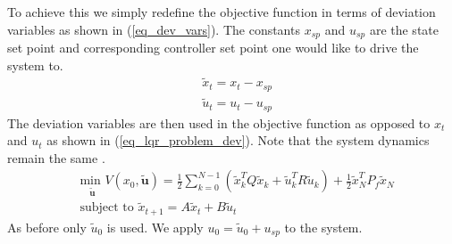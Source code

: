 \documentclass[../masters.tex]{subfiles}
\begin{document}
To achieve this we simply redefine the objective function in terms of deviation variables as shown in (\ref{eq_dev_vars}). The constants $x_{sp}$ and $u_{sp}$ are the state set point and corresponding controller set point one would like to drive the system to.
\begin{equation}
\begin{aligned}
&\tilde{x}_t = x_t-x_{sp} \\
&\tilde{u}_t = u_t-u_{sp}
\end{aligned}
\label{eq_dev_vars}
\end{equation} 
The deviation variables are then used in the objective function as opposed to $x_t$ and $u_t$ as shown in (\ref{eq_lqr_problem_dev}). Note that the system dynamics remain the same \cite{raw}. 
\begin{equation}
\begin{aligned}
&\underset{\tilde{\mathbf{u}}}{\text{min }} V(x_0, \tilde{\mathbf{u}}) = \frac{1}{2}\sum_{k=0}^{N-1} \left( \tilde{x}_k^TQ\tilde{x}_k + \tilde{u}_k^TR\tilde{u}_k \right) + \frac{1}{2}\tilde{x}_N^TP_f\tilde{x}_N \\
& \text{subject to } \tilde{x}_{t+1}=A\tilde{x}_t+B\tilde{u}_t
\end{aligned}
\label{eq_lqr_problem_dev}
\end{equation}
As before only $\tilde{u}_0$ is used. We apply $u_0 = \tilde{u}_0 + u_{sp}$ to the system.
\end{document}
